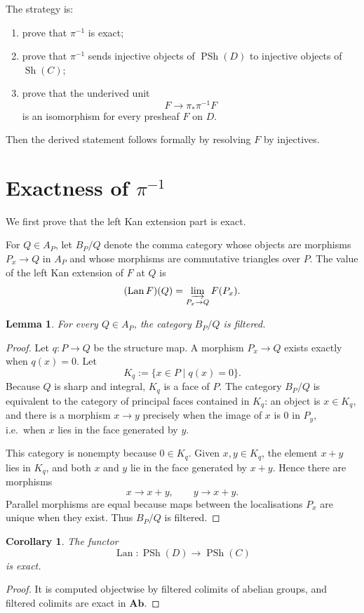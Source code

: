 \documentclass{article}
\newtheorem{lem}[thm]{Lemma}
\newtheorem{cor}[thm]{Corollary}
\theoremstyle{remark}
\DeclareMathOperator{\Sh}{Sh}
\DeclareMathOperator{\PSh}{PSh}
\DeclareMathOperator{\Lan}{Lan}
\begin{document}
The strategy is:
\begin{enumerate}[label=(\alph*)]
\item prove that $\pi^{-1}$ is exact;
\item prove that $\pi^{-1}$ sends injective objects of $\PSh(D)$ to injective objects of $\Sh(C)$;
\item prove that the underived unit
\[
F\longrightarrow \pi_*\pi^{-1}F
\]
is an isomorphism for every presheaf $F$ on $D$.
\end{enumerate}
Then the derived statement follows formally by resolving $F$ by injectives.

\section{Exactness of $\pi^{-1}$}\label{sec:filtered}

We first prove that the left Kan extension part is exact.

For $Q\in A_P$, let $B_P/Q$ denote the comma category whose objects are morphisms $P_x\to Q$ in $A_P$ and whose morphisms are commutative triangles over $P$.  The value of the left Kan extension of $F$ at $Q$ is
\[
(\Lan F)(Q)=\varinjlim_{P_x\to Q}F(P_x).
\]

\begin{lem}\label{lem:filtered}
For every $Q\in A_P$, the category $B_P/Q$ is filtered.
\end{lem}
\begin{proof}
Let $q:P\to Q$ be the structure map.  A morphism $P_x\to Q$ exists exactly when $q(x)=0$.  Let
\[
K_q:=\{x\in P\mid q(x)=0\}.
\]
Because $Q$ is sharp and integral, $K_q$ is a face of $P$.  The category $B_P/Q$ is equivalent to the category of principal faces contained in $K_q$: an object is $x\in K_q$, and there is a morphism $x\to y$ precisely when the image of $x$ is $0$ in $P_y$, i.e.\ when $x$ lies in the face generated by $y$.

This category is nonempty because $0\in K_q$.  Given $x,y\in K_q$, the element $x+y$ lies in $K_q$, and both $x$ and $y$ lie in the face generated by $x+y$.  Hence there are morphisms
\[
x\longrightarrow x+y,\qquad y\longrightarrow x+y.
\]
Parallel morphisms are equal because maps between the localisations $P_x$ are unique when they exist.  Thus $B_P/Q$ is filtered.
\end{proof}

\begin{cor}\label{cor:Lan-exact}
The functor
\[
\Lan:\PSh(D)\longrightarrow \PSh(C)
\]
is exact.
\end{cor}
\begin{proof}
It is computed objectwise by filtered colimits of abelian groups, and filtered colimits are exact in $\mathbf{Ab}$.
\end{proof}
\end{document}
